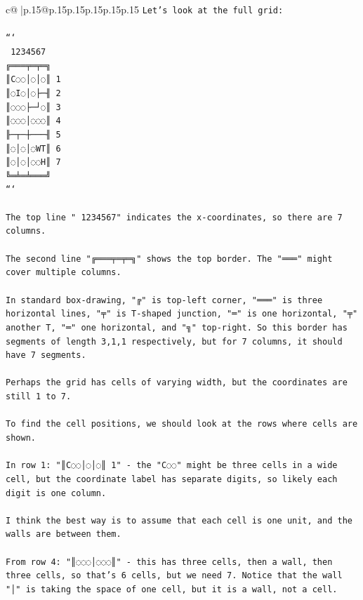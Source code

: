 \documentclass{article}
\begin{document}
{\begin{supertabular}{c@{$\;$}|p{.15\linewidth}@{}p{.15\linewidth}p{.15\linewidth}p{.15\linewidth}p{.15\linewidth}p{.15\linewidth}}
{{{\texttt{Let's look at the full grid:} \\
\\ 
\texttt{```} \\
\texttt{ 1234567} \\
\texttt{╔═══╤═╤═╗} \\
\texttt{║C◌◌│◌│◌║ 1} \\
\texttt{║◌I◌│◌├─╢ 2} \\
\texttt{║◌◌◌├─┘◌║ 3} \\
\texttt{║◌◌◌│◌◌◌║ 4} \\
\texttt{╟─┬─┼───╢ 5} \\
\texttt{║◌│◌│◌WT║ 6} \\
\texttt{║◌│◌│◌◌H║ 7} \\
\texttt{╚═╧═╧═══╝} \\
\texttt{```} \\
\\ 
\texttt{The top line " 1234567" indicates the x{-}coordinates, so there are 7 columns.} \\
\\ 
\texttt{The second line "╔═══╤═╤═╗" shows the top border. The "═══" might cover multiple columns.} \\
\\ 
\texttt{In standard box{-}drawing, "╔" is top{-}left corner, "═══" is three horizontal lines, "╤" is T{-}shaped junction, "═" is one horizontal, "╤" another T, "═" one horizontal, and "╗" top{-}right. So this border has segments of length 3,1,1 respectively, but for 7 columns, it should have 7 segments.} \\
\\ 
\texttt{Perhaps the grid has cells of varying width, but the coordinates are still 1 to 7.} \\
\\ 
\texttt{To find the cell positions, we should look at the rows where cells are shown.} \\
\\ 
\texttt{In row 1: "║C◌◌│◌│◌║ 1" {-} the "C◌◌" might be three cells in a wide cell, but the coordinate label has separate digits, so likely each digit is one column.} \\
\\ 
\texttt{I think the best way is to assume that each cell is one unit, and the walls are between them.} \\
\\ 
\texttt{From row 4: "║◌◌◌│◌◌◌║" {-} this has three cells, then a wall, then three cells, so that's 6 cells, but we need 7. Notice that the wall "│" is taking the space of one cell, but it is a wall, not a cell.} \\
}}}
\end{supertabular}}
\end{document}
